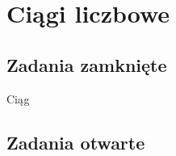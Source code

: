\setcounter{parc}{0}
\addtocounter{chapc}{1}

\chapter{Ciągi liczbowe}

\section{Zadania zamknięte}

\zadanie Ciąg

\section{Zadania otwarte}

